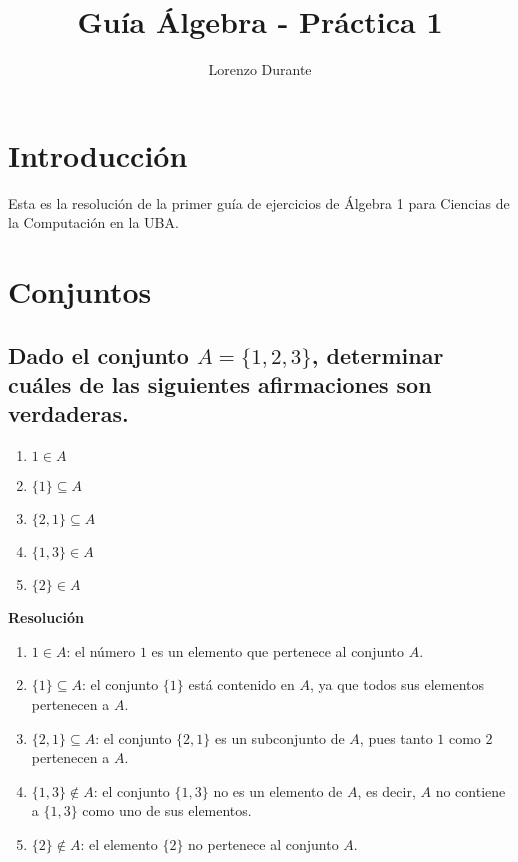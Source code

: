 \documentclass{article}
\title{Guía Álgebra - Práctica 1}
\author{Lorenzo Durante}
\begin{document}
\maketitle

\section{Introducción}
{Esta es la resolución de la primer guía de ejercicios de Álgebra 1 para Ciencias de la Computación en la UBA.}

\section{Conjuntos}
\subsection{Dado el conjunto \texorpdfstring{$A = \{ 1, 2, 3\}$}{A = {1, 2, 3}}, determinar cuáles de las siguientes afirmaciones son verdaderas.}

\begin{enumerate}[label=\roman*)]
    \item $1 \in A$
    \item $\{1\} \subseteq A$
    \item $\{2,1\} \subseteq A$
    \item $\{1,3\} \in A$
    \item $\{2\} \in A$
\end{enumerate}
\textbf{Resolución}

\begin{enumerate}[label=\roman*)]
    \item $1 \in A$: el número $1$ es un elemento que pertenece al conjunto $A$.
    
    \item $\{1\} \subseteq A$: el conjunto $\{1\}$ está contenido en $A$, ya que todos sus elementos pertenecen a $A$.
    
    \item $\{2,1\} \subseteq A$: el conjunto $\{2,1\}$ es un subconjunto de $A$, pues tanto $1$ como $2$ pertenecen a $A$.
    
    \item $\{1,3\} \notin A$: el conjunto $\{1,3\}$ no es un elemento de $A$, es decir, $A$ no contiene a $\{1,3\}$ como uno de sus elementos.
    
    \item $\{2\} \notin A$: el elemento $\{2\}$ no pertenece al conjunto $A$. 
\end{enumerate}
\end{document}
